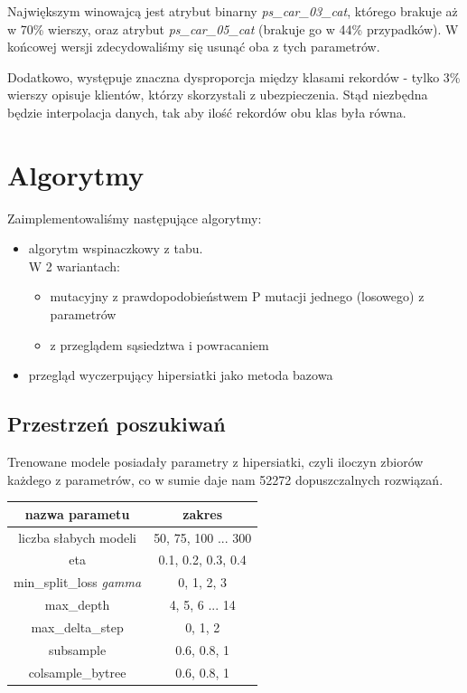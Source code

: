 \documentclass[11pt]{article}
\begin{document}
Największym winowajcą jest atrybut binarny \textsl{ps\_car\_03\_cat}, którego brakuje aż w 70\% wierszy, oraz atrybut \textsl{ps\_car\_05\_cat} (brakuje go w 44\% przypadków). W końcowej wersji zdecydowaliśmy się usunąć oba z tych parametrów.

Dodatkowo, występuje znaczna dysproporcja między klasami rekordów - tylko 3\% wierszy opisuje klientów, którzy skorzystali z ubezpieczenia. Stąd niezbędna będzie interpolacja danych, tak aby ilość rekordów obu klas była równa.

\section{Algorytmy}
Zaimplementowaliśmy następujące algorytmy:
\begin{itemize}
	\item algorytm wspinaczkowy z tabu. \\ 
	W 2 wariantach:
		\begin{itemize}
			\item mutacyjny z prawdopodobieństwem P mutacji jednego (losowego) z parametrów
			\item z przeglądem sąsiedztwa i powracaniem
		\end{itemize}
	\item przegląd wyczerpujący hipersiatki jako metoda bazowa\\
\end{itemize}
\subsection{Przestrzeń poszukiwań}
Trenowane modele posiadały parametry z hipersiatki, czyli iloczyn zbiorów każdego z parametrów, co w sumie daje nam 52272 dopuszczalnych rozwiązań.
\begin{center}
	\begin{tabular}{|c|c|}
		\hline
		nazwa parametu & zakres \\
		\hline
		\hline
		liczba słabych modeli &  50, 75, 100 ... 300\\ %
		\hline
		eta &  0.1, 0.2, 0.3, 0.4\\ %
		\hline 
		min\_split\_loss \textit{gamma} & 0, 1, 2, 3\\ %
		\hline 
		max\_depth & 4, 5, 6 ... 14\\
		\hline 
		max\_delta\_step & 0, 1, 2\\
		\hline 
		subsample & 0.6, 0.8, 1\\
		\hline
		colsample\_bytree &  0.6, 0.8, 1\\ %
		\hline 
	\end{tabular}
\end{center}
\end{document}
